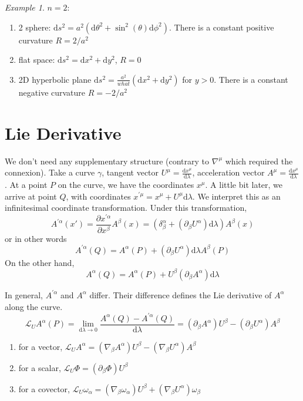 \documentclass[a4paper]{book}
\theoremstyle{definition}
\theoremstyle{remark}
\newtheorem*{example}{Example}
\begin{document}
\begin{example}
    $n = 2$:
    \begin{enumerate}
        \item 2 sphere: $\text{d}s^2 = a^2(\text{d}\theta^2 + \sin^2(\theta) \text{d}\phi^2)$. There is a constant positive curvature $R = 2/a^2$
        \item flat space: $\text{d}s^2 = \text{d}x^2 + \text{d}y^2$, $R = 0$
        \item 2D hyperbolic plane $\text{d}s^2 = \frac{a^2}{what}(\text{d}x^2 + \text{d}y^2)$ for $y>0$. There is a constant negative curvature $R = -2/a^2$
    \end{enumerate}
\end{example}

\section{Lie Derivative}
We don't need any supplementary structure (contrary to $\nabla^\mu$ which required the connexion). Take a curve $\gamma$, tangent vector $U^\mu = \frac{\text{d}x^\mu}{\text{d}\lambda}$, acceleration vector $A^\mu = \frac{\text{d}x^\mu}{\text{d}\lambda}$. At a point $P$ on the curve, we have the coordinates $x^\mu$. A little bit later, we arrive at point $Q$, with coordinates $x^{'\mu} = x^\mu + U^\mu \text{d}\lambda$. We interpret this as an infinitesimal coordinate transformation. Under this transformation, 
\begin{equation}
    A^{'\alpha}(x') = \frac{\partial x^{'\alpha}}{\partial x^\beta} A^\beta (x) = (\delta^\alpha_\beta + (\partial_\beta U^\alpha)\text{d}\lambda) A^\beta(x)
\end{equation}
or in other words
\begin{equation}
    A^{'\alpha}(Q) = A^{\alpha}(P) + (\partial_\beta U^\alpha)\text{d}\lambda A^\beta(P)
\end{equation}
On the other hand, 
\begin{equation}
    A^\alpha(Q) = A^\alpha(P) + U^\beta (\partial_\beta A^\alpha)\text{d}\lambda
\end{equation}

In general, $A^{'\alpha}$ and $A^{\alpha}$ differ. Their difference defines the Lie derivative of $A^\alpha$ along the curve. 
\begin{equation}
    \mathcal{L}_U A^\alpha (P) = \lim_{\text{d}\lambda \rightarrow 0} \frac{A^\alpha(Q) - A^{'\alpha}(Q)}{\text{d}\lambda} = (\partial_\beta A^\alpha)U^\beta - (\partial_\beta U^\alpha) A^\beta
\end{equation}
\begin{enumerate}
    \item for a vector, $\mathcal{L}_U A^\alpha = (\nabla _\beta A^\alpha)U^\beta - (\nabla_\beta U^{\alpha})A^{\beta}$
    \item for a scalar, $\mathcal{L}_U\Phi = (\partial_\beta \Phi)U^\beta$
    \item for a covector, $\mathcal{L}_U \omega_\alpha = (\nabla _\beta \omega_\alpha)U^\beta + (\nabla_\beta U^{\alpha})\omega_{\beta}$
\end{enumerate}
\end{document}
